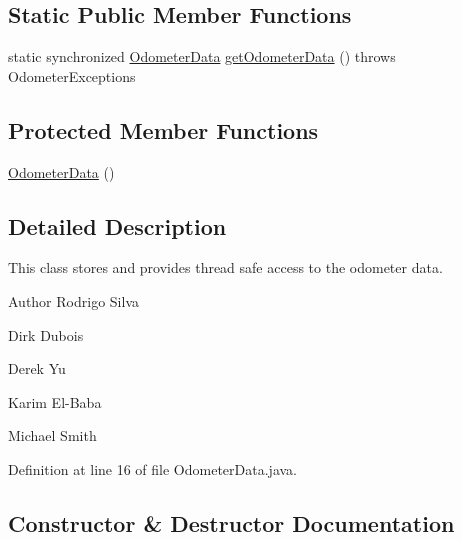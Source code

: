 \subsection*{Static Public Member Functions}
\begin{DoxyCompactItemize}
\item 
static synchronized \hyperlink{classca_1_1mcgill_1_1ecse211_1_1odometer_1_1_odometer_data}{Odometer\+Data} \hyperlink{classca_1_1mcgill_1_1ecse211_1_1odometer_1_1_odometer_data_afff2d760dd1f861b580f3eacef37f1cc}{get\+Odometer\+Data} ()  throws Odometer\+Exceptions 
\end{DoxyCompactItemize}
\subsection*{Protected Member Functions}
\begin{DoxyCompactItemize}
\item 
\hyperlink{classca_1_1mcgill_1_1ecse211_1_1odometer_1_1_odometer_data_a91412854b75c41bf3af7c8892ec0fe87}{Odometer\+Data} ()
\end{DoxyCompactItemize}


\subsection{Detailed Description}
This class stores and provides thread safe access to the odometer data.

\begin{DoxyAuthor}{Author}
Rodrigo Silva 

Dirk Dubois 

Derek Yu 

Karim El-\/\+Baba 

Michael Smith 
\end{DoxyAuthor}


Definition at line 16 of file Odometer\+Data.\+java.



\subsection{Constructor \& Destructor Documentation}
\mbox{\label{classca_1_1mcgill_1_1ecse211_1_1odometer_1_1_odometer_data_a91412854b75c41bf3af7c8892ec0fe87}} 
